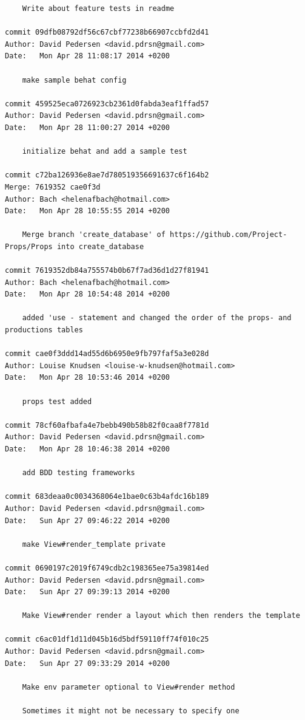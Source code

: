 \documentclass[12pt]{article}
\begin{document}
\begin{verbatim}
    Write about feature tests in readme

commit 09dfb08792df56c67cbf77238b66907ccbfd2d41
Author: David Pedersen <david.pdrsn@gmail.com>
Date:   Mon Apr 28 11:08:17 2014 +0200

    make sample behat config

commit 459525eca0726923cb2361d0fabda3eaf1ffad57
Author: David Pedersen <david.pdrsn@gmail.com>
Date:   Mon Apr 28 11:00:27 2014 +0200

    initialize behat and add a sample test

commit c72ba126936e8ae7d780519356691637c6f164b2
Merge: 7619352 cae0f3d
Author: Bach <helenafbach@hotmail.com>
Date:   Mon Apr 28 10:55:55 2014 +0200

    Merge branch 'create_database' of https://github.com/Project-Props/Props into create_database

commit 7619352db84a755574b0b67f7ad36d1d27f81941
Author: Bach <helenafbach@hotmail.com>
Date:   Mon Apr 28 10:54:48 2014 +0200

    added 'use - statement and changed the order of the props- and productions tables

commit cae0f3ddd14ad55d6b6950e9fb797faf5a3e028d
Author: Louise Knudsen <louise-w-knudsen@hotmail.com>
Date:   Mon Apr 28 10:53:46 2014 +0200

    props test added

commit 78cf60afbafa4e7bebb490b58b82f0caa8f7781d
Author: David Pedersen <david.pdrsn@gmail.com>
Date:   Mon Apr 28 10:46:38 2014 +0200

    add BDD testing frameworks

commit 683deaa0c0034368064e1bae0c63b4afdc16b189
Author: David Pedersen <david.pdrsn@gmail.com>
Date:   Sun Apr 27 09:46:22 2014 +0200

    make View#render_template private

commit 0690197c2019f6749cdb2c198365ee75a39814ed
Author: David Pedersen <david.pdrsn@gmail.com>
Date:   Sun Apr 27 09:39:13 2014 +0200

    Make View#render render a layout which then renders the template

commit c6ac01df1d11d045b16d5bdf59110ff74f010c25
Author: David Pedersen <david.pdrsn@gmail.com>
Date:   Sun Apr 27 09:33:29 2014 +0200

    Make env parameter optional to View#render method
    
    Sometimes it might not be necessary to specify one


\end{verbatim}
\end{document}
